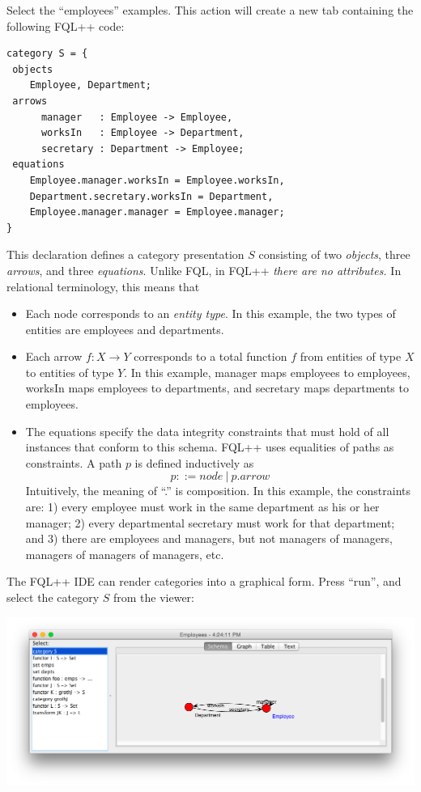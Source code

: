 \documentclass[12pt]{article}
\begin{document}
Select the ``employees'' examples.  This action will create a new tab containing the following FQL++ code:
\begin{verbatim}
category S = { 
 objects
 	Employee, Department;
 arrows
	  manager   : Employee -> Employee,
	  worksIn   : Employee -> Department,
	  secretary : Department -> Employee;
 equations  
  	Employee.manager.worksIn = Employee.worksIn,
  	Department.secretary.worksIn = Department,
  	Employee.manager.manager = Employee.manager; 
}\end{verbatim}
This declaration defines a category presentation $S$ consisting of two {\it objects}, three {\it arrows}, and three {\it equations}.  Unlike FQL, in FQL++ {\it there are no attributes.}  In relational terminology, this means that   
\begin{itemize}
\item Each node corresponds to an {\it entity type}.  In this example, the two types of entities are employees and departments.
\item Each arrow $f : X \to Y$ corresponds to a total function $f$ from entities of type $X$ to entities of type $Y$.   In this example, manager maps employees to employees, worksIn maps employees to departments, and secretary maps departments to employees.
\item The equations specify the data integrity constraints that must hold of all instances that conform to this schema.  FQL++ uses equalities of paths as constraints.  A path $p$ is defined inductively as
$$
p ::= node \ | \ p.arrow
$$ 
Intuitively, the meaning of ``.'' is composition.  In this example, the constraints are: 1) every employee must work in the same department as his or her manager; 2) every departmental secretary must work for that department; and 3) there are employees and managers, but not managers of managers, managers of managers of managers, etc.
\end{itemize}
The FQL++ IDE can render categories into a graphical form.  Press ``run'', and select the category $S$ from the viewer:

\begin{center}
\includegraphics[width=6in]{schema}
\end{center}
\end{document}
